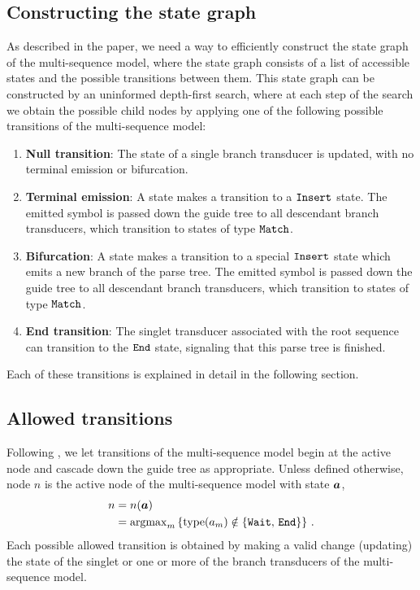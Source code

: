 \documentclass[10pt]{article}
\begin{document}
\subsection{Constructing the state graph} 

As described in the paper,
we need a way to efficiently construct the state graph of the multi-sequence model,
where the state graph consists of a list of accessible states and the possible transitions between them.
This state graph can be constructed by an uninformed depth-first search,
where at each step of the search we obtain the possible child nodes 
by applying one of the following possible transitions of the multi-sequence model:
\begin{enumerate}
\item {\bf Null transition}:
  The state of a single branch transducer is updated, with no terminal emission or bifurcation.
\item {\bf Terminal emission}:
  A state makes a transition to a $\mathtt{Insert}$ state.  The emitted symbol is passed down the guide
  tree to all descendant branch transducers, which transition to states of type $\mathtt{Match}$.
\item {\bf Bifurcation}:
  A state makes a transition to a special $\mathtt{Insert}$ state which emits a new branch of the parse tree.
  The emitted symbol is passed down the guide tree to all descendant branch transducers, 
  which transition to states of type $\mathtt{Match}$.
\item {\bf End transition}:
  The singlet transducer associated with the root sequence can transition to the $\mathtt{End}$ state,
  signaling that this parse tree is finished.
\end{enumerate}

Each of these transitions is explained in detail in the following section.



\subsection{Allowed transitions} 

Following \cite{Holmes2003},  we let transitions of the multi-sequence model begin at the active node and cascade down the guide tree
as appropriate.  Unless defined otherwise, node $n$ is the active node of the multi-sequence model with state $\boldsymbol{a}$, 
\begin{align}
  n &= n(\boldsymbol{a}) \\
  &= \mathrm{argmax}_m \left\{\operatorname{type}(a_m) \notin \{\mathtt{Wait},\,\mathtt{End}\}\right\} \, . \label{eqn:activenode} 
\end{align}
Each possible allowed transition is obtained by making a valid change (updating) the 
state of the singlet or one or more of the branch transducers of the multi-sequence model.
\end{document}
